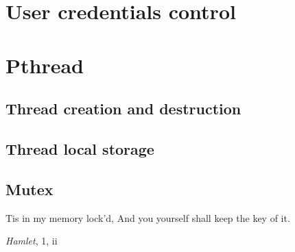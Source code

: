 

\section{User credentials control}

\section{Pthread}

\subsection{Thread creation and destruction}

\subsection{Thread local storage}

\subsection{Mutex}

\epigraph{Tis in my memory lock'd,\newline
          And you yourself shall keep the key of it.}{\textit{Hamlet}, 1, ii}

